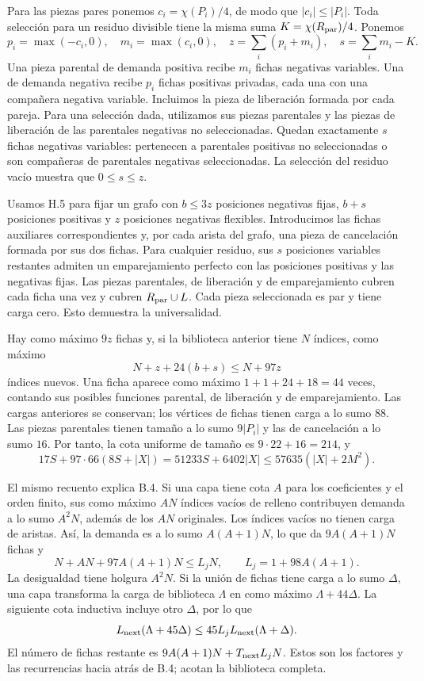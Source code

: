 \documentclass[spanish,11pt,a4paper]{article}
\begin{document}
Para las piezas pares ponemos \(c_i=\chi(P_i)/4\), de modo que \(|c_i|\le|P_i|\). Toda selección para un residuo divisible tiene la misma suma \(K=\chi(R_{\rm par})/4\). Ponemos \[p_i=\max(-c_i,0),\quad m_i=\max(c_i,0),\quad
z=\sum_i(p_i+m_i),\quad s=\sum_i m_i-K.\] Una pieza parental de demanda positiva recibe \(m_i\) fichas negativas variables. Una de demanda negativa recibe \(p_i\) fichas positivas privadas, cada una con una compañera negativa variable. Incluimos la pieza de liberación formada por cada pareja. Para una selección dada, utilizamos sus piezas parentales y las piezas de liberación de las parentales negativas no seleccionadas. Quedan exactamente \(s\) fichas negativas variables: pertenecen a parentales positivas no seleccionadas o son compañeras de parentales negativas seleccionadas. La selección del residuo vacío muestra que \(0\le s\le z\).

Usamos H.5 para fijar un grafo con \(b\le3z\) posiciones negativas fijas, \(b+s\) posiciones positivas y \(z\) posiciones negativas flexibles. Introducimos las fichas auxiliares correspondientes y, por cada arista del grafo, una pieza de cancelación formada por sus dos fichas. Para cualquier residuo, sus \(s\) posiciones variables restantes admiten un emparejamiento perfecto con las posiciones positivas y las negativas fijas. Las piezas parentales, de liberación y de emparejamiento cubren cada ficha una vez y cubren \(R_{\rm par}\cup L\). Cada pieza seleccionada es par y tiene carga cero. Esto demuestra la universalidad.

Hay como máximo \(9z\) fichas y, si la biblioteca anterior tiene \(N\) índices, como máximo \[N+z+24(b+s)\le N+97z\] índices nuevos. Una ficha aparece como máximo \(1+1+24+18=44\) veces, contando sus posibles funciones parental, de liberación y de emparejamiento. Las cargas anteriores se conservan; los vértices de fichas tienen carga a lo sumo \(88\). Las piezas parentales tienen tamaño a lo sumo \(9|P_i|\) y las de cancelación a lo sumo \(16\). Por tanto, la cota uniforme de tamaño es \(9\cdot22+16=214\), y \[17S+97\cdot66(8S+|X|)
=51233S+6402|X|\le57635(|X|+2M^2).\]

El mismo recuento explica B.4. Si una capa tiene cota \(A\) para los coeficientes y el orden finito, sus como máximo \(AN\) índices vacíos de relleno contribuyen demanda a lo sumo \(A^2N\), además de los \(AN\) originales. Los índices vacíos no tienen carga de aristas. Así, la demanda es a lo sumo \(A(A+1)N\), lo que da \(9A(A+1)N\) fichas y \[N+AN+97A(A+1)N\le L_jN,\qquad L_j=1+98A(A+1).\] La desigualdad tiene holgura \(A^2N\). Si la unión de fichas tiene carga a lo sumo \(\Delta\), una capa transforma la carga de biblioteca \(\Lambda\) en como máximo \(\Lambda+44\Delta\). La siguiente cota inductiva incluye otro \(\Delta\), por lo que \[L_{\rm next}(\Lambda+45\Delta)
\le45L_jL_{\rm next}(\Lambda+\Delta).\] El número de fichas restante es \(9A(A+1)N+T_{\rm next}L_jN\). Estos son los factores y las recurrencias hacia atrás de B.4; acotan la biblioteca completa.
\end{document}
